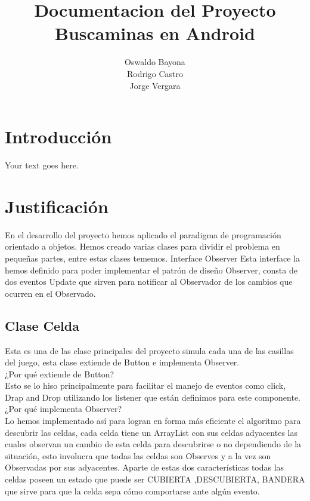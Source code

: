 \documentclass[11pt]{article} %
\title{Documentacion del Proyecto Buscaminas en Android}
\author{Oswaldo Bayona\\Rodrigo Castro\\Jorge Vergara}
\begin{document}
\maketitle

\section{Introducción}

Your text goes here.

\section{Justificación}



En el desarrollo del proyecto hemos aplicado el paradigma de programación orientado a objetos. Hemos creado varias clases para dividir el problema en pequeñas partes, entre estas clases tememos.
Interface Observer
Esta interface la hemos definido para poder implementar el patrón de diseño Observer, consta de dos eventos Update que sirven para notificar al Observador de los cambios que ocurren en el Observado.

\subsection{Clase Celda}
Esta es una de las clase principales del proyecto simula cada una de las casillas del juego, esta clase extiende de Button e implementa Observer.\\
¿Por qué extiende de Button?\\
Esto se lo hiso principalmente para facilitar el manejo de eventos como click, Drap and Drop utilizando los listener que están definimos para este componente.\\
¿Por qué implementa Observer?\\
Lo hemos implementado así para logran en forma más eficiente el algoritmo para descubrir las celdas, cada celda tiene un ArrayList con sus celdas adyacentes las cuales observan un cambio de esta celda para descubrirse o no dependiendo de la situación, esto involucra que todas las celdas son Observes y a la vez son Observadas por sus adyacentes.
Aparte de estas dos características todas las celdas poseen un estado que puede ser CUBIERTA ,DESCUBIERTA, BANDERA que sirve para que la celda sepa cómo comportarse ante algún evento.\\
\end{document}
